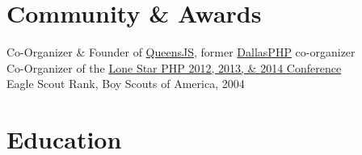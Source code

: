 \documentclass{resume}
\begin{document}
\section{Community \& Awards}

Co-Organizer \& Founder of \href{http://queensjs.com/}{QueensJS}, former \href{http://www.meetup.com/dallasphp/}{DallasPHP} co-organizer
\\
Co-Organizer of the \href{http://lonestarphp.com/}{Lone Star PHP 2012, 2013, \& 2014 Conference}
\\
Eagle Scout Rank, Boy Scouts of America, 2004

\section{Education}

\end{document}
